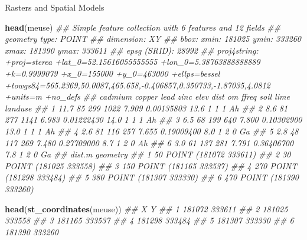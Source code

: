 \documentclass[11pt,ignorenonframetext,]{beamer}
\newenvironment{Shaded}{}{}
\newcommand{\CommentTok}[1]{\textcolor[rgb]{0.38,0.63,0.69}{\textit{#1}}}
\newcommand{\KeywordTok}[1]{\textcolor[rgb]{0.00,0.44,0.13}{\textbf{#1}}}
\newcommand{\NormalTok}[1]{#1}
\let\oldShaded\Shaded
\let\endoldShaded\endShaded
\renewenvironment{Shaded}{\footnotesize\begin{spacing}{0.9}\oldShaded}{\endoldShaded\end{spacing}}
\let\oldverbatim\verbatim
\let\endoldverbatim\endverbatim
\newcommand{\scriptoutput}{
  \renewenvironment{Shaded}{\scriptsize\begin{spacing}{0.9}\oldShaded}{\endoldShaded\end{spacing}}
  \renewenvironment{verbatim}{\scriptsize\begin{spacing}{0.9}\oldverbatim}{\endoldverbatim\end{spacing}}
}
\begin{document}
\begin{frame}[fragile,t]{Rasters and Spatial Models}
\protect\hypertarget{rasters-and-spatial-models}{}

\scriptoutput

\begin{Shaded}
\begin{Highlighting}[]
\KeywordTok{head}\NormalTok{(meuse)}
\CommentTok{## Simple feature collection with 6 features and 12 fields}
\CommentTok{## geometry type:  POINT}
\CommentTok{## dimension:      XY}
\CommentTok{## bbox:           xmin: 181025 ymin: 333260 xmax: 181390 ymax: 333611}
\CommentTok{## epsg (SRID):    28992}
\CommentTok{## proj4string:    +proj=sterea +lat_0=52.15616055555555 +lon_0=5.38763888888889 +k=0.9999079 +x_0=155000 +y_0=463000 +ellps=bessel +towgs84=565.2369,50.0087,465.658,-0.406857,0.350733,-1.87035,4.0812 +units=m +no_defs}
\CommentTok{##   cadmium copper lead zinc  elev       dist   om ffreq soil lime landuse}
\CommentTok{## 1    11.7     85  299 1022 7.909 0.00135803 13.6     1    1    1      Ah}
\CommentTok{## 2     8.6     81  277 1141 6.983 0.01222430 14.0     1    1    1      Ah}
\CommentTok{## 3     6.5     68  199  640 7.800 0.10302900 13.0     1    1    1      Ah}
\CommentTok{## 4     2.6     81  116  257 7.655 0.19009400  8.0     1    2    0      Ga}
\CommentTok{## 5     2.8     48  117  269 7.480 0.27709000  8.7     1    2    0      Ah}
\CommentTok{## 6     3.0     61  137  281 7.791 0.36406700  7.8     1    2    0      Ga}
\CommentTok{##   dist.m              geometry}
\CommentTok{## 1     50 POINT (181072 333611)}
\CommentTok{## 2     30 POINT (181025 333558)}
\CommentTok{## 3    150 POINT (181165 333537)}
\CommentTok{## 4    270 POINT (181298 333484)}
\CommentTok{## 5    380 POINT (181307 333330)}
\CommentTok{## 6    470 POINT (181390 333260)}

\KeywordTok{head}\NormalTok{(}\KeywordTok{st_coordinates}\NormalTok{(meuse))}
\CommentTok{##        X      Y}
\CommentTok{## 1 181072 333611}
\CommentTok{## 2 181025 333558}
\CommentTok{## 3 181165 333537}
\CommentTok{## 4 181298 333484}
\CommentTok{## 5 181307 333330}
\CommentTok{## 6 181390 333260}
\end{Highlighting}
\end{Shaded}

\end{frame}
\end{document}
